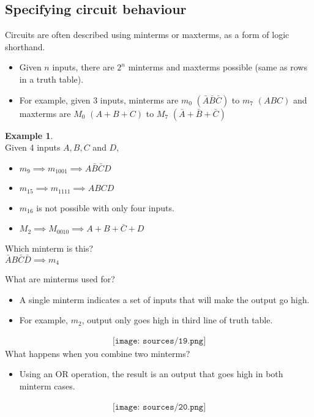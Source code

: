 \documentclass[12pt]{article}
\theoremstyle{definition}
\newtheorem{example}{Example}[section]
\begin{document}
\subsection{Specifying circuit behaviour}
Circuits are often described using minterms or maxterms, as a form of logic shorthand.
\begin{itemize}
    \item Given $n$ inputs, there are $2^n$ minterms and maxterms possible (same as rows in a truth table).
    \item For example, given 3 inputs, minterms are $m_0$ $(\bar{A}\bar{B}\bar{C})$ to $m_7$ $(ABC)$ and maxterms are $M_0$ $(A+B+C)$ to $M_7$ $(\bar{A}+\bar{B}+\bar{C})$
\end{itemize}
\begin{example}
    \ \\
    Given 4 inputs $A, B, C$ and $D$,\\
    \begin{itemize}
        \item $m_9\implies m_{1001}\implies A\bar{B}\bar{C}D$
        \item $m_{15}\implies m_{1111}\implies ABCD$
        \item $m_{16}$ is not possible with only four inputs.
        \item $M_2\implies M_{0010}\implies A+B+\bar{C}+D$
    \end{itemize}
    Which minterm is this?\\$\bar{A}B\bar{C}\bar{D}\implies m_4$
\end{example}
What are minterms used for?
\begin{itemize}
    \item A single minterm indicates a set of inputs that will make the output go high.
    \item For example, $m_2$, output only goes high in third line of truth table.
\end{itemize}
\begin{align*}
    \texttt{[image: sources/19.png]}
\end{align*}
What happens when you combine two minterms?
\begin{itemize}
    \item Using an OR operation, the result is an output that goes high in both minterm cases.
\end{itemize}
\begin{align*}
    \texttt{[image: sources/20.png]}
\end{align*}
\end{document}
